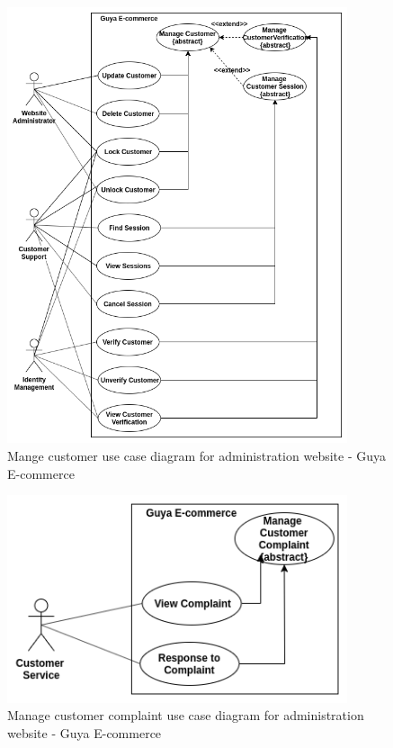 \begin{figure}[!ht]
\centering
\includegraphics[width=10cm,keepaspectratio]{usecases/manage_customers_usecase}
\caption{Mange customer use case diagram for administration website - Guya E-commerce}
\end{figure}

\begin{figure}[!ht]
\centering
\includegraphics[width=10cm,keepaspectratio]{usecases/manage_customer_complaint}
\caption{Manage customer complaint use case diagram for administration website - Guya E-commerce}
\end{figure}

